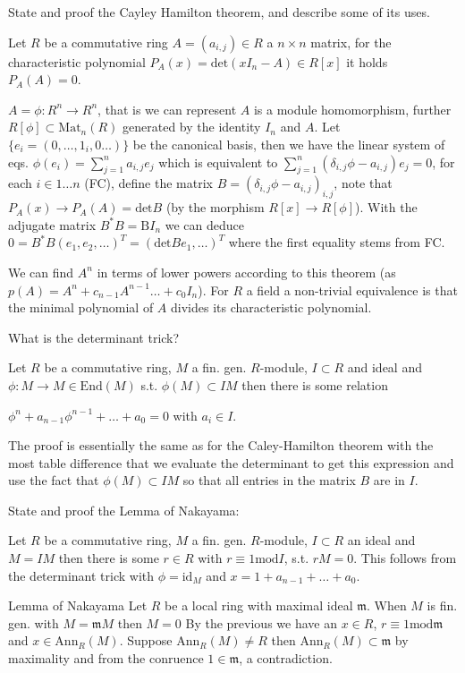 State and proof the Cayley Hamilton theorem, and describe some of its uses.

Let \(R\) be a commutative ring \(A = (a_{i,j}) \in R\) a \(n \times n\) matrix, for the characteristic polynomial
\(P_A(x) = \text{det}(xI_n - A) \in R[x]\) it holds \(P_A(A) = 0\).

\(A = \phi : R^n \to R^n\), that is we can represent \(A\) is a module homomorphism, further \(R[\phi] \subset \text{Mat}_n(R)\) generated
by the identity \(I_n\) and \(A\). Let \(\{e_i = (0, \dots, 1_i, 0 \dots) \}\) be the canonical basis, then we have the linear system of eqs.
\(\phi(e_i) = \sum^{n}_{j = 1} a_{i, j} e_j\) which is equivalent to \(\sum_{j = 1}^{n} (\delta_{i,j} \phi - a_{i, j}) e_j = 0\), for each \(i \in 1 \dots n\) (FC),
define the matrix \(B = (\delta_{i,j} \phi - a_{i, j})_{i,j}\), note that \(P_A(x) \to P_A(A) = \text{det} B\) (by the morphism \(R[x] \to R[\phi]\)).
With the adjugate matrix \(B^{*}B = \text{B}I_n\) we can deduce \(0 = B^{*}B(e_1, e_2, \dots)^{T} = (\text{det}Be_1, \dots)^{T}\) where the first equality stems from FC.

We can find \(A^n\) in terms of lower powers according to this theorem (as \(p(A) = A^n + c_{n-1}A^{n-1} \dots + c_0 I_n\)).
For \(R\) a field a non-trivial equivalence is that the minimal polynomial of \(A\) divides its characteristic polynomial.

What is the determinant trick?

Let \(R\) be a commutative ring, \(M\) a fin. gen. \(R\)-module, \(I \subset R\) and ideal and \(\phi : M \to M \in \text{End}(M)\) s.t. \(\phi(M) \subset IM\) 
then there is some relation

\(\phi^{n} + a_{n-1}\phi^{n-1} + \dots + a_0 = 0\) with \(a_i \in I\).

The proof is essentially the same as for the Caley-Hamilton theorem with the most table difference that we evaluate the determinant to get this expression
and use the fact that \(\phi(M) \subset IM\) so that all entries in the matrix \(B\) are in \(I\).

State and proof the Lemma of Nakayama:

Let \(R\) be a commutative ring, \(M\) a fin. gen. \(R\)-module, \(I \subset R\) an ideal and \(M = IM\) then there is some \(r \in R\) with
\(r \equiv 1 \text{mod} I\), s.t. \(rM = 0\). This follows from the determinant trick with \(\phi = \text{id}_M\) and \(x = 1 + a_{n-1} + \dots + a_0\).

Lemma of Nakayama
Let \(R\) be a local ring with maximal ideal \(\mathfrak{m}\). When \(M\) is fin. gen. with \(M = \mathfrak{m}M\) then \(M = 0\)
By the previous we have an \(x \in R\), \(r \equiv 1 \text{mod} \mathfrak{m}\) and \(x \in \text{Ann}_R(M)\). Suppose \(\text{Ann}_R(M) \neq R\)
then \(\text{Ann}_R(M) \subset \mathfrak{m}\) by maximality and from the conruence \(1 \in \mathfrak{m}\), a contradiction.

